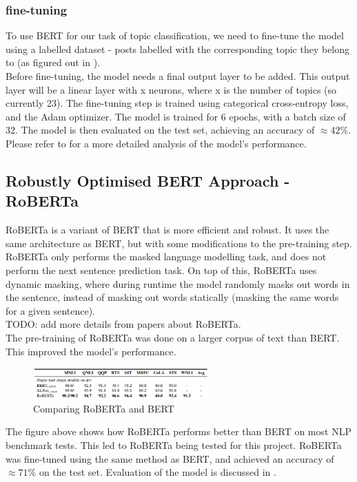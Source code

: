 \subsubsection{fine-tuning}
To use BERT for our task of topic classification, we need to fine-tune the model using a labelled dataset - posts labelled with the
corresponding topic they belong to (as figured out in ).\\
Before fine-tuning, the model needs a final output layer to be added. This output layer will be a linear layer with x neurons, where
x is the number of topics (so currently 23). The fine-tuning step is trained using categorical cross-entropy loss, and the Adam optimizer.
The model is trained for 6 epochs, with a batch size of 32. The model is then evaluated on the test set, achieving an accuracy
of $\approx 42\%$. Please refer to for a more detailed analysis of the model's performance.

\subsection{Robustly Optimised BERT Approach - RoBERTa}
RoBERTa is a variant of BERT that is more efficient and robust. It uses the same architecture as BERT, but with some modifications to 
the pre-training step. RoBERTa only performs the masked language modelling task, and does not perform the next sentence prediction task.
On top of this, RoBERTa uses dynamic masking, where during runtime the model randomly masks out words in the sentence, instead of
masking out words statically (masking the same words for a given sentence).\\
TODO: add more details from papers about RoBERTa.\\
The pre-training of RoBERTa was done on a larger corpus of text than BERT. This improved the model's performance.
\begin{figure}
    \centering
    \includegraphics[width=0.6\textwidth]{../images/roberta-tasks.png}
    \caption{Comparing RoBERTa and BERT \cite{DBLP:journals/corr/abs-1907-11692}}
    \label{fig:bertcomproberta}
\end{figure}

The figure above shows how RoBERTa performs better than BERT on most NLP benchmark tests. This led to RoBERTa being tested for
this project. RoBERTa was fine-tuned using the same method as BERT, and achieved an accuracy of $\approx 71\%$ on the test set.
Evaluation of the model is discussed in .